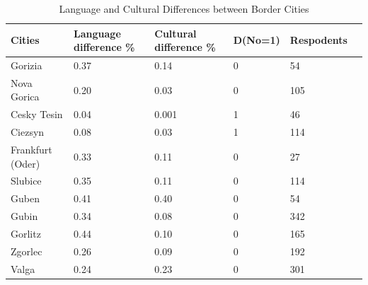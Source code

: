 \documentclass[12pt]{article}    %
\begin{document}
\begin{table}[H] \hypertarget{Table 2.C.1}{}
\renewcommand\thetable{2.C.1}
\begin{tabular}{llllll}
\caption{Language and Cultural Differences between Border Cities }
\textbf{Cities}          & \textbf{Language difference \%} & \textbf{Cultural difference \%} & D(No=1) & Respodents & \\
\hline
\hline
Gorizia              & 0.37                         & 0.14                         & 0                      & 54                   &                          \\
Nova Gorica          & 0.20                         & 0.03                         & 0                      & 105                  &                          \\
\hline
Cesky Tesin & 0.04                         & 0.001                        & 1                      & 46                   &                          \\
Ciezsyn    & 0.08                         & 0.03                         & 1                      & 114                  &                          \\
\hline
Frankfurt (Oder)     & 0.33                         & 0.11                         & 0                      & 27                   &                          \\
Slubice              & 0.35                         & 0.11                         & 0                      & 114                  &                          \\
\hline
Guben                & 0.41                         & 0.40                         & 0                      & 54                   &                          \\
Gubin                & 0.34                         & 0.08                         & 0                      & 342                  &                          \\
\hline
Gorlitz              & 0.44                         & 0.10                         & 0                      & 165                  &                          \\
Zgorlec              & 0.26                         & 0.09                         & 0                      & 192                  &                          \\
\hline
Valga                & 0.24                         & 0.23                         & 0                      & 301                  &                          \\

\end{tabular}
\end{table}
\end{document}
